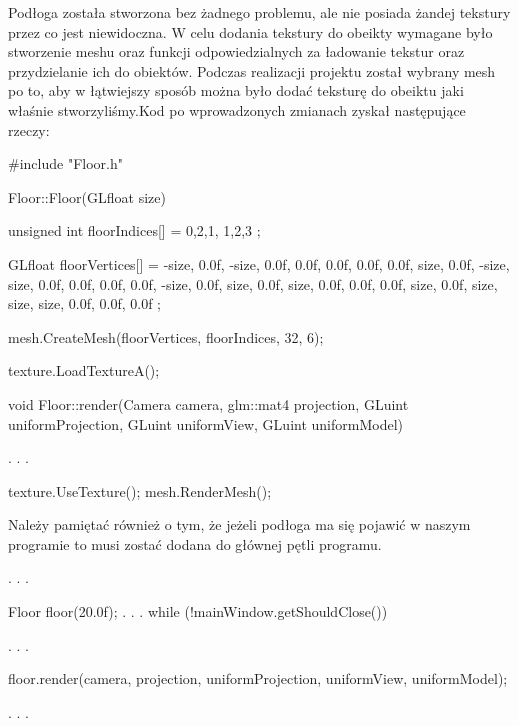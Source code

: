 \documentclass[a4paper,12pt]{article}
\numberwithin{equation}{section}
\begin{document}
Podłoga została stworzona bez żadnego problemu, ale nie posiada żandej tekstury przez co jest niewidoczna. W celu dodania tekstury do obeikty wymagane było stworzenie meshu oraz funkcji odpowiedzialnych za ładowanie tekstur oraz przydzielanie ich do obiektów. Podczas realizacji projektu został wybrany mesh po to, aby w łątwiejszy sposób można było dodać teksturę do obeiktu jaki właśnie stworzyliśmy.Kod po wprowadzonych zmianach zyskał następujące rzeczy:
\begin{cppcode}
#include "Floor.h"

Floor::Floor(GLfloat size)
{
	unsigned int floorIndices[] = {
		0,2,1,
		1,2,3
	};

	GLfloat floorVertices[] = {
		-size,  0.0f, -size,   0.0f,  0.0f,   0.0f,  0.0f,  0.0f,
		 size,  0.0f, -size,  size,  0.0f,	0.0f,  0.0f,  0.0f,
		-size,  0.0f,  size,   0.0f,  size,	0.0f,  0.0f,  0.0f,
		 size,  0.0f,  size,  size,  size,  0.0f,  0.0f,  0.0f
	};

	mesh.CreateMesh(floorVertices, floorIndices, 32, 6);

	texture.LoadTextureA();
}

void Floor::render(Camera camera, glm::mat4 projection, GLuint uniformProjection, GLuint uniformView, GLuint uniformModel)
{
    .
    .   
    .
    
	texture.UseTexture();
	mesh.RenderMesh();
}
\end{cppcode}

Należy pamiętać również o tym, że jeżeli podłoga ma się pojawić w naszym programie to musi zostać dodana do głównej pętli programu.
\begin{cppcode}

        .
        .
        .
        
	Floor floor(20.0f);
        .
        .
        .
	while (!mainWindow.getShouldClose())
	{
        .
        .
        .

		floor.render(camera, projection, uniformProjection, uniformView, uniformModel);
		
        .
        .
        .
	}
\end{cppcode}
\end{document}
